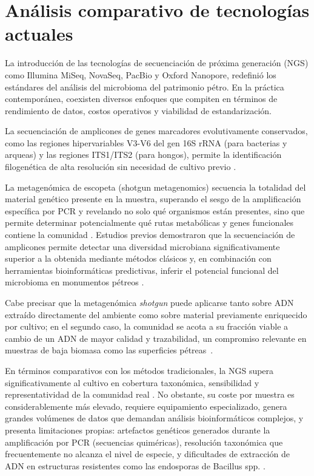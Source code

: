 \section{Análisis comparativo de tecnologías actuales}
\label{sec:analisis_molecular_ngs}

La introducción de las tecnologías de secuenciación de próxima generación (NGS) como Illumina MiSeq, NovaSeq, PacBio y Oxford Nanopore, redefinió los estándares del análisis del microbioma del patrimonio pétro. En la práctica contemporánea, coexisten diversos enfoques que compiten en términos de rendimiento de datos, costos operativos y viabilidad de estandarización.

La secuenciación de amplicones de genes marcadores evolutivamente conservados, como las regiones hipervariables V3-V6 del gen 16S rRNA (para bacterias y arqueas) y las regiones ITS1/ITS2 (para hongos), permite la identificación filogenética de alta resolución sin necesidad de cultivo previo \cite{suchy2024, chimienti2016}.

La metagenómica de escopeta (shotgun metagenomics) secuencia la totalidad del material genético presente en la muestra, superando el sesgo de la amplificación específica por PCR y revelando no solo qué organismos están presentes, sino que permite determinar potencialmente qué rutas metabólicas y genes funcionales contiene la comunidad \cite{suchy2024, ding2020preahvihear}. Estudios previos demostraron que la secuenciación de amplicones permite detectar una diversidad microbiana significativamente superior a la obtenida mediante métodos clásicos y, en combinación con herramientas bioinformáticas predictivas, inferir el potencial funcional del microbioma en monumentos pétreos \cite{li2018deterioration, chimienti2016}.

Cabe precisar que la metagenómica \textit{shotgun} puede aplicarse tanto sobre ADN
extraído directamente del ambiente como sobre material previamente enriquecido por
cultivo; en el segundo caso, la comunidad se acota a su fracción viable a cambio de un
ADN de mayor calidad y trazabilidad, un compromiso relevante en muestras de baja biomasa
como las superficies pétreas~\cite{tsukayama2025informe,ding2020}.

En términos comparativos con los métodos tradicionales, la NGS supera significativamente al cultivo en cobertura taxonómica, sensibilidad y representatividad de la comunidad real \cite{sterflinger2013, suchy2024, gutarowska2015}. No obstante, su coste por muestra es considerablemente más elevado, requiere equipamiento especializado, genera grandes volúmenes de datos que demandan análisis bioinformáticos complejos, y presenta limitaciones propias: artefactos genéticos generados durante la amplificación por PCR (secuencias quiméricas), resolución taxonómica que frecuentemente no alcanza el nivel de especie, y dificultades de extracción de ADN en estructuras resistentes como las endosporas de Bacillus spp. \cite{branysova2022, li2018deterioration, skipper2022}.

